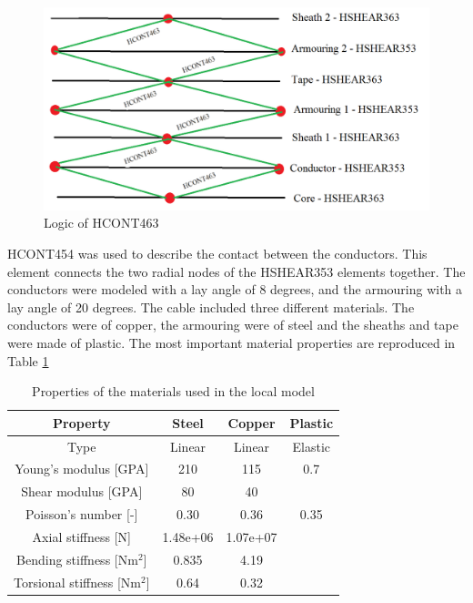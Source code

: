\begin{figure}[H]
\centering
\includegraphics[scale=0.5]{figures/contact}
\caption[$\; \:$Logic of HCONT463]{Logic of HCONT463}
 \label{fig:contact}
\end{figure}
HCONT454 was used to describe the contact between the conductors. This element connects the two radial nodes of the HSHEAR353 elements together.\newline
\newline
The conductors were modeled with a lay angle of 8 degrees, and the armouring with a lay angle of 20 degrees. \newline
\newline
The cable included three different materials. The conductors were of copper, the armouring were of steel and the sheaths and tape were made of plastic. The most important material properties are reproduced in Table \ref{table:matprop}
\begin{table} [H]
\centering
\begin{tabular}{ |c|c|c|c|}
\hline
Property &Steel & Copper  & Plastic \\
 \hline
 \hline
Type & Linear & Linear & Elastic\\
Young's modulus [GPA] & 210 & 115 & 0.7\\
Shear modulus [GPA]& 80 & 40 &  \\
Poisson's number [-]& 0.30 & 0.36 & 0.35\\
Axial stiffness [N]& 1.48e+06 & 1.07e+07 & \\
Bending stiffness [Nm$^2$] & 0.835 & 4.19 &\\
Torsional stiffness [Nm$^2$] & 0.64 & 0.32&\\
 \hline
\end{tabular}
\caption{Properties of the materials used in the local model}
\label{table:matprop}
\end{table}
